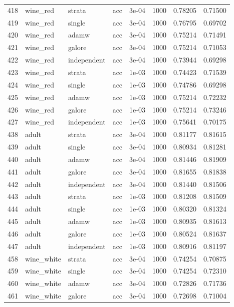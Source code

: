\begin{longtable}{rlllrrrr}
418 & wine\_red & strata & acc & 3e-04 & 1000 & 0.78205 & 0.71500 \\
419 & wine\_red & single & acc & 3e-04 & 1000 & 0.76795 & 0.69702 \\
420 & wine\_red & adamw & acc & 3e-04 & 1000 & 0.75214 & 0.71491 \\
421 & wine\_red & galore & acc & 3e-04 & 1000 & 0.75214 & 0.71053 \\
422 & wine\_red & independent & acc & 3e-04 & 1000 & 0.73944 & 0.69298 \\
\rowcolor{oursbg}
423 & wine\_red & strata & acc & 1e-03 & 1000 & 0.74423 & 0.71539 \\
424 & wine\_red & single & acc & 1e-03 & 1000 & 0.74786 & 0.69298 \\
425 & wine\_red & adamw & acc & 1e-03 & 1000 & 0.75214 & 0.72232 \\
426 & wine\_red & galore & acc & 1e-03 & 1000 & 0.75214 & 0.73246 \\
427 & wine\_red & independent & acc & 1e-03 & 1000 & 0.75641 & 0.70175 \\
\rowcolor{oursbg}
438 & adult & strata & acc & 3e-04 & 1000 & 0.81177 & 0.81615 \\
439 & adult & single & acc & 3e-04 & 1000 & 0.80934 & 0.81281 \\
440 & adult & adamw & acc & 3e-04 & 1000 & 0.81446 & 0.81909 \\
441 & adult & galore & acc & 3e-04 & 1000 & 0.81655 & 0.81838 \\
442 & adult & independent & acc & 3e-04 & 1000 & 0.81440 & 0.81506 \\
\rowcolor{oursbg}
443 & adult & strata & acc & 1e-03 & 1000 & 0.81208 & 0.81509 \\
444 & adult & single & acc & 1e-03 & 1000 & 0.80320 & 0.81324 \\
445 & adult & adamw & acc & 1e-03 & 1000 & 0.80935 & 0.81613 \\
446 & adult & galore & acc & 1e-03 & 1000 & 0.80524 & 0.81637 \\
447 & adult & independent & acc & 1e-03 & 1000 & 0.80916 & 0.81197 \\
\rowcolor{oursbg}
458 & wine\_white & strata & acc & 3e-04 & 1000 & 0.74254 & 0.70875 \\
459 & wine\_white & single & acc & 3e-04 & 1000 & 0.74254 & 0.72310 \\
460 & wine\_white & adamw & acc & 3e-04 & 1000 & 0.72826 & 0.71736 \\
461 & wine\_white & galore & acc & 3e-04 & 1000 & 0.72698 & 0.71004 \\

\end{longtable}
